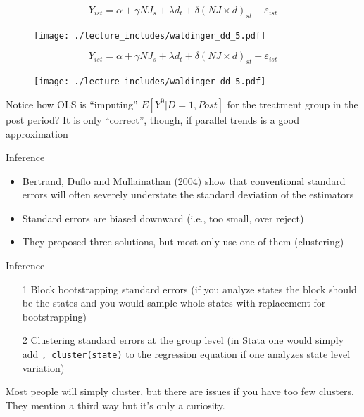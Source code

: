 \documentclass{beamer}
\begin{document}
\begin{frame}[plain]
	$$Y_{ist} = \alpha + \gamma NJ_s + \lambda d_t + \delta(NJ\times d)_{st} + \varepsilon_{ist}$$
	\begin{figure}
	\texttt{[image: ./lecture\_includes/waldinger\_dd\_5.pdf]}
	\end{figure}
\end{frame}


\begin{frame}[plain]
	$$Y_{ist} = \alpha + \gamma NJ_s + \lambda d_t + \delta(NJ\times d)_{st} + \varepsilon_{ist}$$
	\begin{figure}
	\texttt{[image: ./lecture\_includes/waldinger\_dd\_5.pdf]}
	\end{figure}

Notice how OLS is ``imputing'' $E[Y^0|D=1,Post]$ for the treatment group in the post period? It is only ``correct'', though, if parallel trends is a good approximation

\end{frame}


\begin{frame}{Inference}
	
	\begin{itemize}
	\item  Bertrand, Duflo and Mullainathan (2004) show that conventional standard errors will often severely understate the standard deviation of the estimators
	\item Standard errors are biased downward (i.e., too small, over reject)
	\item They proposed three solutions, but most only use one of them (clustering)
	\end{itemize}
\end{frame}


\begin{frame}{Inference}
	
		\begin{enumerate}
		\item[1 ] Block bootstrapping standard errors (if you analyze states the block should be the states and you would sample whole states with replacement for bootstrapping)
		\item[2 ] Clustering standard errors at the group level (in Stata one would simply add \texttt{, cluster(state)} to the regression equation if one analyzes state level variation)
		\end{enumerate}

\bigskip

Most people will simply cluster, but there are issues if you have too few clusters. They mention a third way but it's only a curiosity.
		
\end{frame}
\end{document}
